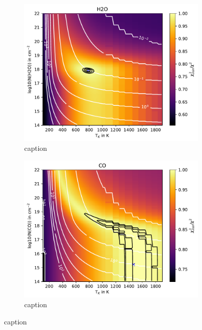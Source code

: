 \documentclass[oneside, single, authoryear, semicolon, 12pt]{lion-msc}
\newcommand{\4}{$_4$}
\newcommand{\3}{$_3$}
\newcommand{\2}{$_2$}
\begin{document}
\begin{figure}[!ht]
    \centering
    \begin{subfigure}[b]{0.49\textwidth}
        \centering
        \includegraphics[width=\textwidth]{radexpy_niels/Radexpy_for_Niels/chi2_map_H2O_Sz98.pdf}
        \caption{caption}
    \end{subfigure}
    \hfill
    \begin{subfigure}[b]{0.49\textwidth}
        \centering
        \includegraphics[width=\textwidth]{radexpy_niels/Radexpy_for_Niels/chi2_map_CO_Sz98.pdf}
        \caption{caption}
    \end{subfigure}
    \caption{caption}
\end{figure}
\end{document}
